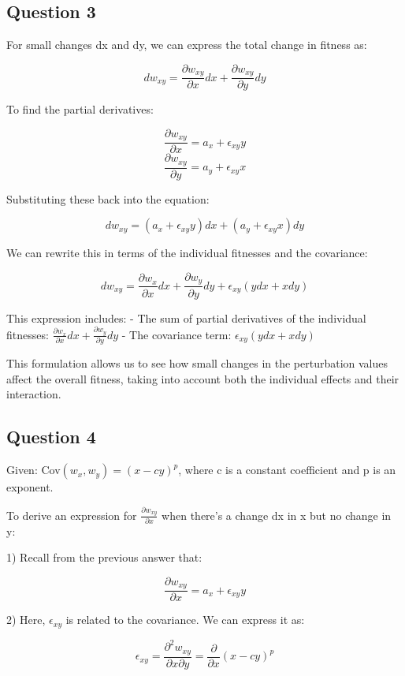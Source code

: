 \documentclass{article}
\begin{document}
\subsection{Question 3}

For small changes dx and dy, we can express the total change in fitness as:

\[dw_{xy} = \frac{\partial w_{xy}}{\partial x} dx + \frac{\partial w_{xy}}{\partial y} dy\]

To find the partial derivatives:

\[\frac{\partial w_{xy}}{\partial x} = a_x + \epsilon_{xy} y\]
\[\frac{\partial w_{xy}}{\partial y} = a_y + \epsilon_{xy} x\]

Substituting these back into the equation:

\[dw_{xy} = (a_x + \epsilon_{xy} y) dx + (a_y + \epsilon_{xy} x) dy\]

We can rewrite this in terms of the individual fitnesses and the covariance:

\[dw_{xy} = \frac{\partial w_x}{\partial x} dx + \frac{\partial w_y}{\partial y} dy + \epsilon_{xy} (y dx + x dy)\]

This expression includes:
- The sum of partial derivatives of the individual fitnesses: $\frac{\partial w_x}{\partial x} dx + \frac{\partial w_y}{\partial y} dy$
- The covariance term: $\epsilon_{xy} (y dx + x dy)$

This formulation allows us to see how small changes in the perturbation values affect the overall fitness, taking into account both the individual effects and their interaction.

\subsection{Question 4}

Given: Cov$(w_x,w_y) = (x-cy)^p$, where c is a constant coefficient and p is an exponent.

To derive an expression for $\frac{\partial w_{xy}}{\partial x}$ when there's a change dx in x but no change in y:

1) Recall from the previous answer that:

   $$\frac{\partial w_{xy}}{\partial x} = a_x + \epsilon_{xy} y$$

2) Here, $\epsilon_{xy}$ is related to the covariance. We can express it as:

   $$\epsilon_{xy} = \frac{\partial^2 w_{xy}}{\partial x \partial y} = \frac{\partial}{\partial x}(x-cy)^p$$
\end{document}

